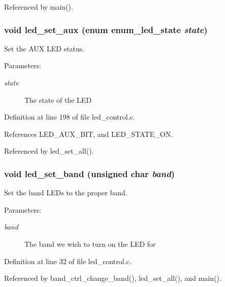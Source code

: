 Referenced by main().
\subsubsection[{led\_\-set\_\-aux}]{\setlength{\rightskip}{0pt plus 5cm}void led\_\-set\_\-aux (enum {\bf enum\_\-led\_\-state} {\em state})}\label{led__control_8h_c6073b4001daa7a7ea4f7220dcbe62a4}


Set the AUX LED status. 

\begin{Desc}
\item[Parameters:]
\begin{description}
\item[{\em state}]The state of the LED \end{description}
\end{Desc}


Definition at line 198 of file led\_\-control.c.

References LED\_\-AUX\_\-BIT, and LED\_\-STATE\_\-ON.

Referenced by led\_\-set\_\-all().
\subsubsection[{led\_\-set\_\-band}]{\setlength{\rightskip}{0pt plus 5cm}void led\_\-set\_\-band (unsigned char {\em band})}\label{led__control_8h_5bfe45c367d2201775bbf65a55ff3634}


Set the band LEDs to the proper band. 

\begin{Desc}
\item[Parameters:]
\begin{description}
\item[{\em band}]The band we wish to turn on the LED for \end{description}
\end{Desc}


Definition at line 32 of file led\_\-control.c.

Referenced by band\_\-ctrl\_\-change\_\-band(), led\_\-set\_\-all(), and main().
